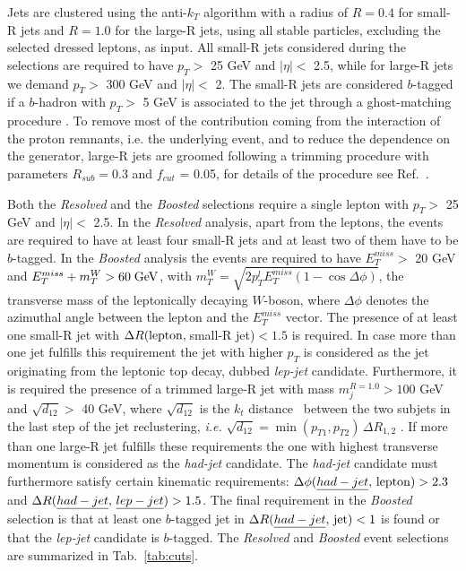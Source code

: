 \documentclass[aps,prd,amsmath,amssymb,superscriptaddress, preprintnumbers,preprint,nofootinbib,a4paper]{revtex4}
\begin{document}
Jets are clustered using the anti-$k_{T}$ algorithm \cite{Cacciari:2008gp} with a radius of $R=0.4$ for
small-R jets and $R=1.0$ for the large-R jets, using all stable particles, excluding the selected
dressed leptons, as input. All small-R jets considered during the selections are required to have
$p_T > $ 25 GeV and $|\eta| < $ 2.5, while for large-R jets we demand $p_T > $ 300 GeV and $|\eta| < $ 2.
The small-R jets are considered $b$-tagged if a $b$-hadron with $p_T > $ 5 GeV is associated to the jet
through a ghost-matching procedure \cite{Cacciari:2008gn,Cacciari:2007fd}. To remove most of the
contribution coming from the interaction of the proton remnants, i.e. the underlying event, and to
reduce the dependence on the generator, large-R jets are groomed following a trimming procedure with
parameters $R_{sub} = 0.3$ and $f_{cut}$ = 0.05, for details of the procedure see Ref.~\cite{Krohn:2009th}.

Both the \emph{Resolved} and the \emph{Boosted} selections require a single lepton with $p_T > $ 25 GeV
and $|\eta| < $ 2.5. In the \emph{Resolved} analysis, apart from the leptons, the events are required to
have at least four small-R jets and at least two of them have to be $b$-tagged. In the \emph{Boosted}
analysis the events are required to have $E_T^{miss} > $ 20 GeV and $E_T^{miss}+m^W_{T}> 60\;{\rm GeV}$, with
$m^W_T = \sqrt{2 p_T^l E_T^{miss} (1 - \cos\Delta \phi)}$, the transverse mass of the leptonically decaying
$W$-boson, where $\Delta \phi$ denotes the azimuthal angle between the lepton and the $E_{T}^{miss}$ vector.
The presence of at least one small-R jet with $\Delta R ({\rm lepton},\,${\rm small-R jet})$<1.5$ is required.
In case more than one jet fulfills this requirement the jet with higher $p_T$ is considered as the
jet originating from the leptonic top decay, dubbed \emph{lep-jet} candidate. Furthermore, it is required the
presence of a trimmed large-R jet with mass $m_j^{R=1.0}> 100$ GeV and $\sqrt{d_{12} }> $ 40 GeV, where
$\sqrt{d_{12} }$ is the $k_t$ distance~\cite{Aad:2013gja,Butterworth:2002tt} between the two subjets in the
last step of the jet reclustering, \emph{i.e.} $\sqrt{d_{12}} = \min(p_{T1}, p_{T2})\,\Delta R_{1,2}$ . If more
than one large-R jet fulfills these requirements the one with highest transverse momentum is considered as
the \emph{had-jet} candidate. The \emph{had-jet} candidate must furthermore satisfy certain kinematic
requirements: $\Delta \phi({\emph{had-jet}},\,{\rm lepton}) > 2.3$ and
$\Delta R({\emph{had-jet}},\,{\emph{lep-jet}}) > 1.5$. The final requirement in the \emph{Boosted} selection
is that at least one $b$-tagged jet in $\Delta R ({\emph{had-jet}},\,{\rm jet}) < 1$ is found or
that the \emph{lep-jet} candidate is $b$-tagged. The \emph{Resolved} and \emph{Boosted} event selections
are summarized in Tab.~\ref{tab:cuts}.
\end{document}
